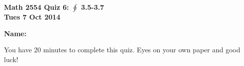 \documentclass[11pt,letterpaper]{article}
\begin{document}
\flushleft
\begin{multicols}{2}

\begin{large}\textbf{Math 2554 Quiz 6: $\oint $ 3.5-3.7 \\
Tues 7 Oct 2014}\end{large}

\hfill\textbf{Name:  }\underline{\hspace{40ex}} %

\vspace{.5in}

\end{multicols}

\pagestyle{empty}

\flushleft

You have 20 minutes to complete this quiz.  Eyes on your own paper and good luck!
\end{document}
